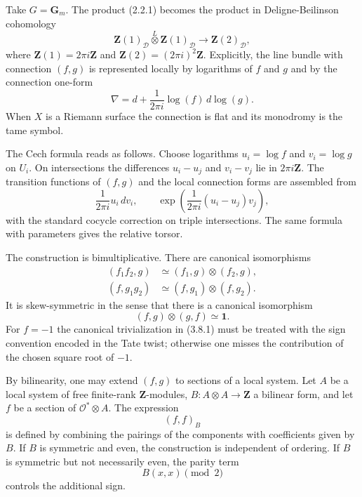 \documentclass[11pt]{article}
\theoremstyle{remark}
\newcommand{\Z}{\mathbf Z}
\newcommand{\Gm}{\mathbf G_m}
\newcommand{\OO}{\mathcal O}
\begin{document}
Take $G=\Gm$. The product (2.2.1) becomes the product in Deligne-Beilinson cohomology
\begin{equation}\tag{3.1.1}
 \Z(1)_{\mathcal D}\overset L\otimes \Z(1)_{\mathcal D}\longrightarrow \Z(2)_{\mathcal D},
\end{equation}
where $\Z(1)=2\pi i\Z$ and $\Z(2)=(2\pi i)^2\Z$. Explicitly, the line bundle with connection $(f,g)$ is represented locally by logarithms of $f$ and $g$ and by the connection one-form
\begin{equation}\tag{3.1.2}
 \nabla=d+\frac{1}{2\pi i}\log(f)\,d\log(g).
\end{equation}
When $X$ is a Riemann surface the connection is flat and its monodromy is the tame symbol.

The Cech formula reads as follows. Choose logarithms $u_i=\log f$ and $v_i=\log g$ on $U_i$. On intersections the differences $u_i-u_j$ and $v_i-v_j$ lie in $2\pi i\Z$. The transition functions of $(f,g)$ and the local connection forms are assembled from
\begin{equation}\tag{3.2.1}
 \frac{1}{2\pi i}u_i\,dv_i,
\qquad
 \exp\left(\frac{1}{2\pi i}(u_i-u_j)v_j\right),
\end{equation}
with the standard cocycle correction on triple intersections. The same formula with parameters gives the relative torsor.

The construction is bimultiplicative. There are canonical isomorphisms
\begin{align}\tag{3.7.1}
 (f_1f_2,g)&\simeq (f_1,g)\otimes(f_2,g),\\
 (f,g_1g_2)&\simeq (f,g_1)\otimes(f,g_2).
\end{align}
It is skew-symmetric in the sense that there is a canonical isomorphism
\begin{equation}\tag{3.8.1}
 (f,g)\otimes(g,f)\simeq \mathbf 1.
\end{equation}
For $f=-1$ the canonical trivialization in (3.8.1) must be treated with the sign convention encoded in the Tate twist; otherwise one misses the contribution of the chosen square root of $-1$.

By bilinearity, one may extend $(f,g)$ to sections of a local system. Let $A$ be a local system of free finite-rank $\Z$-modules, $B:A\otimes A\to\Z$ a bilinear form, and let $f$ be a section of $\OO^*\otimes A$. The expression
\begin{equation}\tag{3.10.1}
 (f,f)_B
\end{equation}
is defined by combining the pairings of the components with coefficients given by $B$. If $B$ is symmetric and even, the construction is independent of ordering. If $B$ is symmetric but not necessarily even, the parity term
\begin{equation}\tag{3.11.1}
 B(x,x)\pmod 2
\end{equation}
controls the additional sign.
\end{document}
